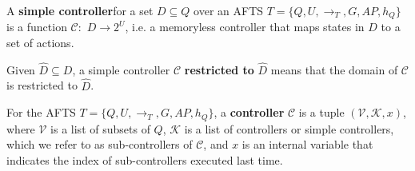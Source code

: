 \begin{definition}
	A \textbf{simple controller}\footnotemark for a set $ D\subseteq Q $ over an AFTS $ T=\{Q,U,\rightarrow_T,G,AP,h_Q\} $ is a function $ \mathcal{C}: $ $ D\rightarrow 2^U $, i.e. a memoryless controller that maps states in $ D $ to a set of actions. %
	\label{def:simp}
\end{definition}

Given $\widehat{D} \subseteq D$, a simple controller $ \mathcal{C} $ \textbf{restricted to} $ \widehat{D} $ means that the domain of $ \mathcal{C} $ is restricted to $\widehat{D}$.

\begin{definition}
	For the AFTS $ T=\{Q,U,\rightarrow_T,G,AP,h_Q\} $, a \textbf{controller} $ \mathcal{C} $ is a tuple $ (\mathcal{V},\mathcal{K},x) $, where $ \mathcal{V} $ is a list of subsets of $ Q $, $ \mathcal{K} $ is a list of controllers or simple controllers, {\color{black} which we refer to as} sub-controllers of $ \mathcal{C} $, and $ x $ is an internal variable that indicates the index of sub-controllers executed last time. %
	
	\label{def:cont}
\end{definition}



